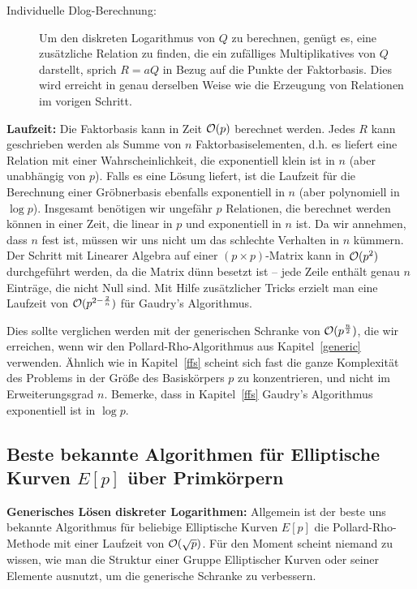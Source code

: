 \begin{refsegment}
\begin{description}
\item[Individuelle Dlog-Berechnung:] Um den diskreten Logarithmus von $Q$ zu berechnen, genügt es, eine zusätzliche Relation zu finden, die ein zufälliges Multiplikatives von $Q$ darstellt, sprich $R=aQ$ in Bezug auf die Punkte der Faktorbasis. Dies wird erreicht in genau derselben Weise wie die Erzeugung von Relationen im vorigen Schritt.
\end{description}


\textbf{Laufzeit:}
Die Faktorbasis kann in Zeit ${\cal O}(p)$ berechnet werden. Jedes $R$ kann geschrieben werden als Summe von $n$ Faktorbasiselementen, d.h. es liefert eine Relation mit einer Wahrscheinlichkeit, die exponentiell klein ist in $n$ (aber unabhängig von $p$). Falls es eine Lösung liefert, ist die Laufzeit für die Berechnung einer Gröbnerbasis ebenfalls exponentiell in $n$ (aber polynomiell in $\log p$). Insgesamt benötigen wir ungefähr $p$ Relationen, die berechnet werden können in einer Zeit, die linear in $p$ und exponentiell in $n$ ist. Da wir annehmen, dass $n$ fest ist, müssen wir uns nicht um das schlechte Verhalten in $n$ kümmern. Der Schritt mit Linearer Algebra auf einer $(p \times p)$-Matrix kann in ${\cal O}(p^2)$ durchgeführt werden, da die Matrix dünn besetzt ist -- jede Zeile enthält genau $n$ Einträge, die nicht Null sind. Mit Hilfe zusätzlicher Tricks erzielt man eine Laufzeit von ${\cal O}(p^{2-\frac 2 n})$ für Gaudry's Algorithmus.

Dies sollte verglichen werden mit der generischen Schranke von ${\cal O}(p^{\frac n 2})$, die wir erreichen, wenn wir den Pollard-Rho-Algorithmus aus Kapitel~\ref{generic} verwenden. Ähnlich wie in Kapitel~\ref{ffs} scheint sich fast die ganze Komplexität des Problems in der Größe des Basiskörpers $p$ zu konzentrieren, und nicht im Erweiterungsgrad $n$. Bemerke, dass in Kapitel~\ref{ffs} Gaudry's Algorithmus exponentiell ist in $\log p$.



\subsection{\texorpdfstring{Beste bekannte Algorithmen für Elliptische Kurven $E[p]$ über Primkörpern}{Beste bekannte Algorithmen für Elliptische Kurven E[p] über Primkörpern}}

\textbf{Generisches Lösen diskreter Logarithmen:}
Allgemein ist der beste uns bekannte Algorithmus für beliebige Elliptische Kurven $E[p]$ die Pollard-Rho-Methode mit einer Laufzeit von ${\cal O}(\sqrt p)$. Für den Moment scheint niemand zu wissen, wie man die Struktur einer Gruppe Elliptischer Kurven oder seiner Elemente ausnutzt, um die generische Schranke zu verbessern.


\end{refsegment}
